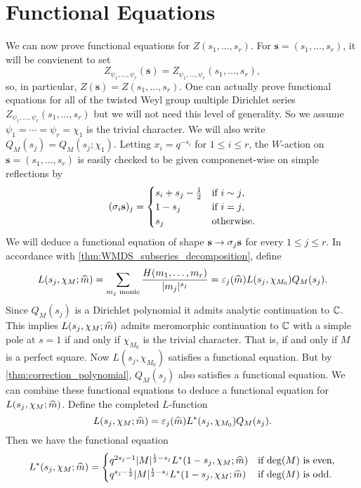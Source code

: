 \documentclass[12pt,reqno,oneside]{amsart}
\begin{document}
\section{Functional Equations}
    We can now prove functional equations for $Z(s_{1},\ldots,s_{r})$. For $\mathbf{s} = (s_{1},\ldots,s_{r})$, it will be convienent to set
    \[
        Z_{\psi_{1},\ldots,\psi_{r}}(\mathbf{s}) = Z_{\psi_{1},\ldots,\psi_{r}}(s_{1},\ldots,s_{r}),
    \]
    so, in particular, $Z(\mathbf{s}) = Z(s_{1},\ldots,s_{r})$. One can actually prove functional equations for all of the twisted Weyl group multiple Dirichlet series $Z_{\psi_{1},\ldots,\psi_{r}}(s_{1},\ldots,s_{r})$ but we will not need this level of generality. So we assume $\psi_{1} = \cdots = \psi_{r} = \chi_{1}$ is the trivial character. We will also write $Q_{M}(s_{j}) = Q_{M}(s_{j};\chi_{1})$. Letting $x_{i} = q^{-s_{i}}$ for $1 \le i \le r$, the $W$-action on $\mathbf{s} = (s_{1},\ldots,s_{r})$ is easily checked to be given componenet-wise on simple reflections by
    \[
        (\sigma_{i}\mathbf{s})_{j} = \begin{cases} s_{i}+s_{j}-\frac{1}{2} & \text{if $i \sim j$}, \\ 1-s_{j} & \text{if $i = j$}, \\ s_{j} & \text{otherwise}.  \end{cases}
    \]
    We will deduce a functional equation of shape $\mathbf{s} \to \sigma_{j}\mathbf{s}$ for every $1 \le j \le r$. In accordance with \cref{thm:WMDS_subseries_decomposition}, define
    \[
        L(s_{j},\chi_{M};\widehat{m}) = \sum_{\text{$m_{j}$ monic}}\frac{H(m_{1},\ldots,m_{r})}{|m_{j}|^{s_{j}}} = \varepsilon_{j}(\widehat{m})L(s_{j},\chi_{M_{0}})Q_{M}(s_{j}).
    \]
    Since $Q_{M}(s_{j})$ is a Dirichlet polynomial it admits analytic continuation to $\mathbb{C}$. This implies $L(s_{j},\chi_{M};\widehat{m})$ admits meromorphic continuation to $\mathbb{C}$ with a simple pole at $s = 1$ if and only if $\chi_{M_{0}}$ is the trivial character. That is, if and only if $M$ is a perfect square. Now $L(s_{j},\chi_{M_{0}})$ satisfies a functional equation. But by \cref{thm:correction_polynomial}, $Q_{M}(s_{j})$ also satisfies a functional equation. We can combine these functional equations to deduce a functional equation for $L(s_{j},\chi_{M};\widehat{m})$. Define the completed $L$-function
    \[
        L(s_{j},\chi_{M};\widehat{m}) = \varepsilon_{j}(\widehat{m})L^{\ast}(s_{j},\chi_{M_{0}})Q_{M}(s_{j}).
    \]
    Then we have the functional equation
    \[
        L^{\ast}(s_{j},\chi_{M};\widehat{m}) = \begin{cases} q^{2s_{j}-1}|M|^{\frac{1}{2}-s_{j}}L^{\ast}(1-s_{j},\chi_{M};\widehat{m}) & \text{if $\deg(M)$ is even}, \\ q^{s_{j}-\frac{1}{2}}|M|^{\frac{1}{2}-s_{j}}L^{\ast}(1-s_{j},\chi_{M};\widehat{m}) & \text{if $\deg(M)$ is odd}. \end{cases}
    \]
\end{document}

